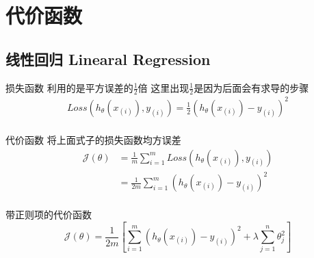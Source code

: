 \section{代价函数}

\subsection{线性回归 Linearal Regression }
\begin{outline}

	\1 损失函数
		\2 利用的是平方误差的$\frac{1}{2}$倍
		\2 这里出现$\frac{1}{2}$是因为后面会有求导的步骤
	\begin{equation}\label{eq:1}
		\begin{aligned}
			Loss(h_{\theta}(x_{(i)}),y_{(i)})=\frac{1}{2}(h_{\theta }(x_{(i)})-y_{(i)})^{2}\\
		\end{aligned}
	\end{equation}

	\1 代价函数
	\2将上面式子的损失函数均方误差
	\begin{equation}\label{eq:2}
		\begin{aligned}
			\mathcal{J} (\theta )
			&=\frac{1}{m}\sum_{i=1}^{m}Loss(h_{\theta}(x_{(i)}),y_{(i)})\\
			&=\frac{1}{2m}\sum_{i = 1}^{m}(h_{\theta }(x_{(i)})-y_{(i)})^{2}\\
		\end{aligned}
	\end{equation}

	\1 带正则项的代价函数
	\begin{equation}\label{eq:3}
		\mathcal{J} (\theta )=\frac{1}{2m}[\sum_{i = 1}^{m}(h_{\theta }(x_{(i)})-y_{(i)})^{2}+\lambda \sum_{j = 1}^{n} \theta_{j}^{2} ]
\end{equation}
\end{outline}

 


